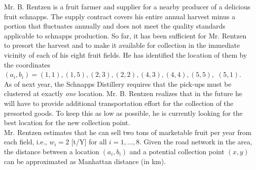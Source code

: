 
Mr. B. Rentzen is a fruit farmer and supplier for a nearby producer of a delicious fruit schnapps. The supply contract covers his entire annual harvest minus a portion that fluctuates annually and does not meet the quality standards applicable to schnapps production. So far, it has been sufficient for Mr. Rentzen to presort the harvest and to make it available for collection in the immediate vicinity of each of his eight fruit fields. He has identified the location of them by the coordinates $(a_i,b_i)=(1,1),(1,5),(2,3),(2,2),(4,3),(4,4),(5,5),$ $(5,1)$.\\ 
As of next year, the Schnapps Distillery requires that the pick-ups must be clustered at exactly \emph{one} location. Mr. B. Rentzen realizes that in the future he will have to provide additional transportation effort for the collection of the presorted goods. To keep this as low as possible, he is currently looking for the best location for the new collection point.\\
Mr. Rentzen estimates that he can sell two tons of marketable fruit per year from each field, i.e., $w_i=2$ [t/Y] for all $i=1,\ldots,8$. Given the road network in the area, the distance between a location $(a_i,b_i)$ and a potential collection point $(x,y)$ can be approximated as Manhattan distance (in km).

